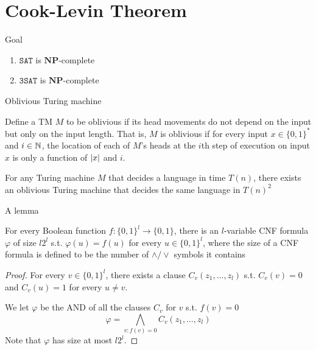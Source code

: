 \documentclass[presentation]{beamer}
\def \NP {\textbf{NP}}
\def \NP {\textbf{NP}}
\def \SAT {\texttt{SAT}}
\def \TSAT {\texttt{3SAT}}
\begin{document}
\section{Cook-Levin Theorem}
\label{sec:org62f336d}
\begin{frame}[label={sec:orga0d8092}]{Goal}
\begin{theorem}
\begin{enumerate}
\item \(\SAT\) is \(\NP\)-complete
\item \(\TSAT\) is \(\NP\)-complete
\end{enumerate}
\end{theorem}
\end{frame}

\begin{frame}[label={sec:org77e22b1}]{Oblivious Turing machine}
\begin{definition}[]
Define a TM \(M\) to be \alert{oblivious} if its head movements do not depend on the input but only on
the input length. That is, \(M\) is oblivious if for every input \(x\in\{0,1\}^*\) and \(i\in\mathbb{N}\), the
location of each of \(M\)'s heads at the \(i\)th step of execution on input \(x\) is only a
function of \(\abs{x}\) and \(i\).
\end{definition}

\begin{theorem}[]
For any Turing machine \(M\) that decides a language in time \(T(n)\), there exists an oblivious
Turing machine that decides the same language in \(T(n)^2\)
\end{theorem}
\end{frame}
\begin{frame}[label={sec:org7870f5b}]{A lemma}
\begin{lemma}[]
For every Boolean function \(f:\{0,1\}^l\to\{0,1\}\), there is an \(l\)-variable CNF formula \(\varphi\)
of size \(l2^l\) s.t. \(\varphi(u)=f(u)\) for every \(u\in\{0,1\}^l\), where the size of a CNF
formula is defined to be the number of \(\wedge/\vee\) symbols it contains
\end{lemma}

\begin{proof}
For every \(v\in\{0,1\}^l\), there exists a clause \(C_v(z_1,\dots,z_l)\) s.t. \(C_v(v)=0\)
and \(C_v(u)=1\) for every \(u\neq v\).

We let \(\varphi\) be the AND of all the clauses \(C_v\) for \(v\) s.t. \(f(v)=0\)
     \begin{equation*}
\varphi=\bigwedge_{v:f(v)=0}C_v(z_1,\dots,z_l)
     \end{equation*}
Note that \(\varphi\) has size at most \(l2^l\).
\end{proof}
\end{frame}
\end{document}
